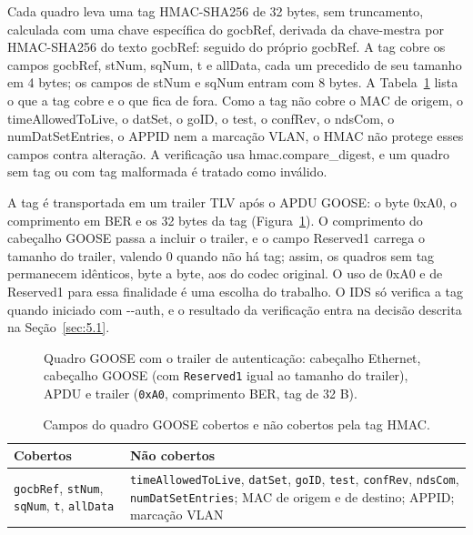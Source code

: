 \documentclass[12pt]{article}
\begin{document}
Cada quadro leva uma tag HMAC-SHA256 de 32 bytes, sem truncamento, calculada com uma chave específica do gocbRef, derivada da chave-mestra por HMAC-SHA256 do texto gocbRef: seguido do próprio gocbRef. A tag cobre os campos gocbRef, stNum, sqNum, t e allData, cada um precedido de seu tamanho em 4 bytes; os campos de stNum e sqNum entram com 8 bytes. A Tabela~\ref{tab:11} lista o que a tag cobre e o que fica de fora. Como a tag não cobre o MAC de origem, o timeAllowedToLive, o datSet, o goID, o test, o confRev, o ndsCom, o numDatSetEntries, o APPID nem a marcação VLAN, o HMAC não protege esses campos contra alteração. A verificação usa hmac.\allowbreak{}compare\_\allowbreak{}digest, e um quadro sem tag ou com tag malformada é tratado como inválido.

A tag é transportada em um trailer TLV após o APDU GOOSE: o byte 0xA0, o comprimento em BER e os 32 bytes da tag (Figura~\ref{fig:5}). O comprimento do cabeçalho GOOSE passa a incluir o trailer, e o campo Reserved1 carrega o tamanho do trailer, valendo 0 quando não há tag; assim, os quadros sem tag permanecem idênticos, byte a byte, aos do codec original. O uso de 0xA0 e de Reserved1 para essa finalidade é uma escolha do trabalho. O IDS só verifica a tag quando iniciado com -{}-auth, e o resultado da verificação entra na decisão descrita na Seção~\ref{sec:5.1}.

\begin{figure}[!t]
\centering

\caption{Quadro GOOSE com o trailer de autenticação: cabeçalho Ethernet, cabeçalho GOOSE (com \texttt{Reserved1} igual ao tamanho do trailer), APDU e trailer (\texttt{0xA0}, comprimento BER, tag de 32 B).}\label{fig:5}
\end{figure}

\begin{table}[!t]
\centering
\caption{Campos do quadro GOOSE cobertos e não cobertos pela tag HMAC.}\label{tab:11}
\footnotesize
\renewcommand{\arraystretch}{1.25}
\begin{tabularx}{\linewidth}{|>{\hsize=0.815\hsize\raggedright\arraybackslash}X|>{\hsize=1.185\hsize\raggedright\arraybackslash}X|}
\hline
\textbf{Cobertos} & \textbf{Não cobertos} \\ \hline
\texttt{gocbRef}, \texttt{stNum}, \texttt{sqNum}, \texttt{t}, \texttt{allData} & \texttt{timeAllowedToLive}, \texttt{datSet}, \texttt{goID}, \texttt{test}, \texttt{confRev}, \texttt{ndsCom}, \texttt{numDatSetEntries}; MAC de origem e de destino; APPID; marcação VLAN \\ \hline
\end{tabularx}
\end{table}
\end{document}
